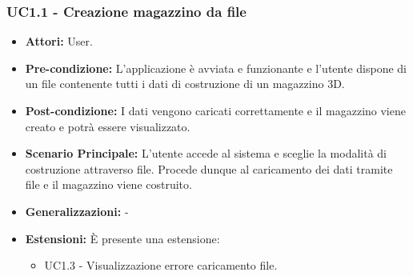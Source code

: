 \subsubsection{UC1.1 - Creazione magazzino da file}
\begin{itemize}
    \item \textbf{Attori:} User.
    \item \textbf{Pre-condizione:} L'applicazione è avviata e funzionante e l'utente dispone di un file contenente tutti i dati di costruzione di un magazzino 3D.
    \item \textbf{Post-condizione:} I dati vengono caricati correttamente e il magazzino viene creato e potrà essere visualizzato.
    \item \textbf{Scenario Principale:}  L’utente accede al sistema e sceglie la modalità di costruzione attraverso file. Procede dunque al caricamento dei dati tramite file e il magazzino viene costruito.
    \item \textbf{Generalizzazioni:} -
    \item \textbf{Estensioni:} È presente una estensione:
    \begin{itemize}
        \item UC1.3 - Visualizzazione errore caricamento file.
    \end{itemize}
\end{itemize}


